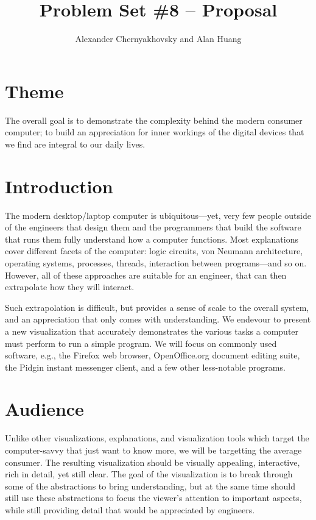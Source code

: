 \documentclass[12pt]{article}
\newcommand{\student}{Alexander Chernyakhovsky and Alan Huang}
\newcommand{\pset}{Problem Set \#8 -- Proposal}
\begin{document}
\title{\pset}
\author{\student}
\date{}
\maketitle
\thispagestyle{fancy}

\section{Theme}
The overall goal is to demonstrate the complexity behind the modern
consumer computer; to build an appreciation for inner workings of the
digital devices that we find are integral to our daily lives.

\section{Introduction}
The modern desktop/laptop computer is ubiquitous---yet, very few
people outside of the engineers that design them and the programmers
that build the software that runs them fully understand how a computer
functions.  Most explanations cover different facets of the computer:
logic circuits, von Neumann architecture, operating systems,
processes, threads, interaction between programs---and so on.
However, all of these approaches are suitable for an engineer, that
can then extrapolate how they will interact.

Such extrapolation is difficult, but provides a sense of scale to the
overall system, and an appreciation that only comes with
understanding.  We endevour to present a new visualization that
accurately demonstrates the various tasks a computer must perform to
run a simple program.  We will focus on commonly used software, e.g.,
the Firefox web browser, OpenOffice.org document editing suite, the
Pidgin instant messenger client, and a few other less-notable programs.

\section{Audience}
Unlike other visualizations, explanations, and visualization tools
which target the computer-savvy that just want to know more, we will
be targetting the average consumer.  The resulting visualization
should be visually appealing, interactive, rich in detail, yet still
clear.  The goal of the visualization is to break through some of the
abstractions to bring understanding, but at the same time should still
use these abstractions to focus the viewer's attention to important
aspects, while still providing detail that would be appreciated by
engineers.
\end{document}
